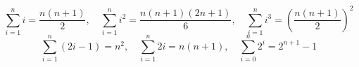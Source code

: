 \[
\sum_{i=1}^{n} i = \frac{n(n+1)}{2}, \quad
\sum_{i=1}^{n} i^2 = \frac{n(n+1)(2n+1)}{6}, \quad
\sum_{i=1}^{n} i^3 = \left( \frac{n(n+1)}{2} \right)^2
\]
\[
\sum_{i=1}^{n} (2i - 1) = n^2, \quad
\sum_{i=1}^{n} 2i = n(n + 1), \quad
\sum_{i=0}^{n} 2^i = 2^{n+1} - 1
\]
